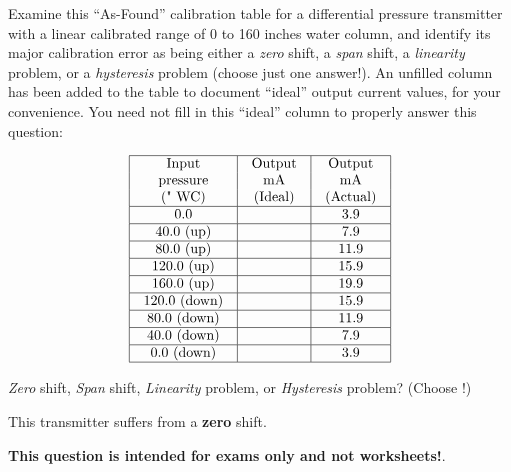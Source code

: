 

Examine this ``As-Found'' calibration table for a differential pressure transmitter with a linear calibrated range of 0 to 160 inches water column, and identify its major calibration error as being either a {\it zero} shift, a {\it span} shift, a {\it linearity} problem, or a {\it hysteresis} problem (choose just one answer!).  An unfilled column has been added to the table to document ``ideal'' output current values, for your convenience.  You need not fill in this ``ideal'' column to properly answer this question:


$$\vbox{\offinterlineskip
\halign{\strut
\vrule \quad\hfil # \ \hfil & 
\vrule \quad\hfil # \ \hfil & 
\vrule \quad\hfil # \ \hfil \vrule \cr
\noalign{\hrule}
%
Input & Output & Output \cr
%
pressure & mA & mA \cr
%
(" WC) & (Ideal) & (Actual) \cr
%
\noalign{\hrule}
%
0.0 & & 3.9 \cr
%
\noalign{\hrule}
%
40.0 (up) & & 7.9 \cr
%
\noalign{\hrule}
%
80.0 (up) & & 11.9 \cr
%
\noalign{\hrule}
%
120.0 (up) & & 15.9 \cr
%
\noalign{\hrule}
%
160.0 (up) & & 19.9 \cr
%
\noalign{\hrule}
%
120.0 (down) & & 15.9 \cr
%
\noalign{\hrule}
%
80.0 (down) & & 11.9 \cr
%
\noalign{\hrule}
%
40.0 (down) & & 7.9 \cr
%
\noalign{\hrule}
%
0.0 (down) & & 3.9 \cr
%
\noalign{\hrule}
} %
}$$ %

{\it Zero} shift, {\it Span} shift, {\it Linearity} problem, or {\it Hysteresis} problem?  (Choose !)







This transmitter suffers from a {\bf zero} shift.







{\bf This question is intended for exams only and not worksheets!}.


